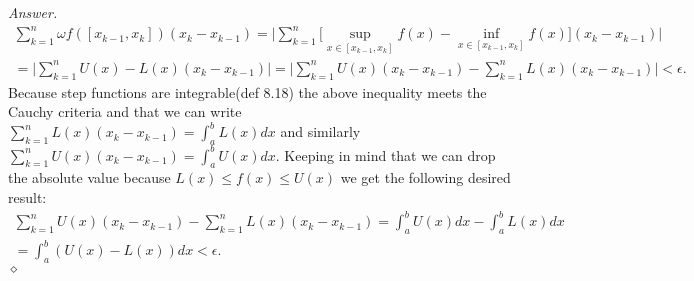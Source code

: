 \documentclass[12pt,oneside]{amsart}
\theoremstyle{definition}
\theoremstyle{remark}
\numberwithin{equation}{exer}
\newenvironment{answer}{\bigskip\noindent\emph{Answer.}}{\hfill$\diamond$\newline}
\begin{document}
\begin{answer}
\begin{align*}
    \sum_{k=1}^n \omega f([x_{k-1},x_k])(x_k-x_{k-1}) 
    = \Bigg|\sum_{k=1}^n\Big[\sup_{x\in[x_{k-1},x_k]} f(x) - \inf_{x\in[x_{k-1},x_k]} f(x)\Big](x_k-x_{k-1})\Bigg|\\
    =\Bigg|\sum_{k=1}^n U(x)-L(x)(x_k-x_{k-1})\Bigg| =\Bigg|\sum_{k=1}^n U(x)(x_k-x_{k-1})-\sum_{k=1}^n L(x)(x_k-x_{k-1})\Bigg| < \epsilon.
\end{align*}
\newline
Because step functions are integrable(def 8.18) the above inequality meets the Cauchy criteria and that we can write  $\sum_{k=1}^n L(x)(x_k-x_{k-1}) = \int_a^b L(x)dx$ and similarly $\sum_{k=1}^n U(x)(x_k-x_{k-1}) = \int_a^b U(x)dx$. Keeping in mind that we can drop the absolute value because $L(x)\leq f(x)\leq U(x)$ we get the following desired result:
\begin{align*}
    \sum_{k=1}^n U(x)(x_k-x_{k-1})-\sum_{k=1}^n L(x)(x_k-x_{k-1}) = \int_a^b U(x)dx -\int_a^b L(x)dx \\= \int_a^b (U(x)-L(x))dx < \epsilon.
\end{align*}
\end{answer}
\end{document}
